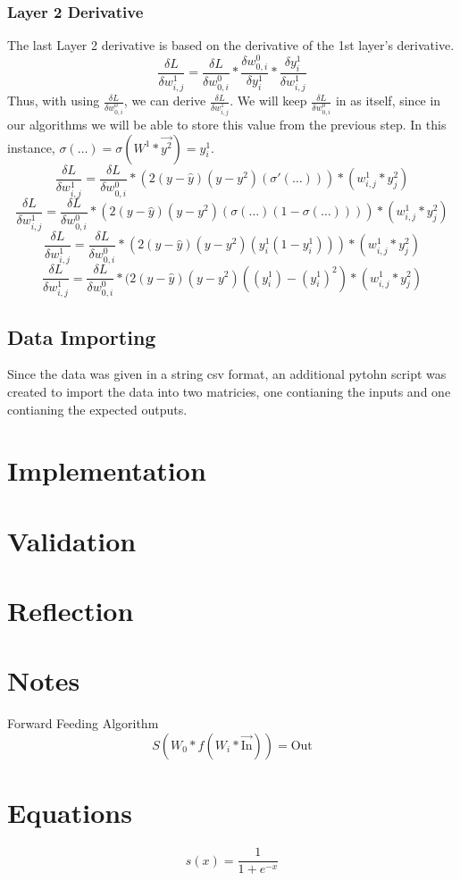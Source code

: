\documentclass[10pt]{article}
\begin{document}
\subsubsection{Layer 2 Derivative}
The last Layer 2 derivative is based on the derivative of the 1st layer's derivative.
$$\frac{\delta L}{\delta w^1_{i,j}} = \frac{\delta L}{\delta w^0_{0,i}} * \frac{\delta w^0_{0,i}}{\delta y^1_i} * \frac{\delta y^1_i}{\delta w^1_{i,j}}$$
Thus, with using $\frac{\delta L}{\delta w^0_{0,i}}$, we can derive $\frac{\delta L}{\delta w^1_{i,j}}$. We will keep $\frac{\delta L}{\delta w^0_{0,i}}$ in as itself, since in our algorithms we will be able to store this value from the previous step. In this instance, $\sigma(\ldots) = \sigma(W^1 * \vec{y^2}) = y^1_i$.
$$\frac{\delta L}{\delta w^1_{i,j}} = \frac{\delta L}{\delta w^0_{0,i}} * (2(y-\hat{y})(y - y^2)(\sigma'(\ldots))) * (w^1_{i,j} * y^2_{j})$$
$$\frac{\delta L}{\delta w^1_{i,j}} = \frac{\delta L}{\delta w^0_{0,i} }* (2(y - \hat{y})(y - y^2)(\sigma(\ldots)(1 - \sigma(\ldots)))) * (w^1_{i,j} * y^2_{j})$$
$$\frac{\delta L}{\delta w^1_{i,j}} = \frac{\delta L}{\delta w^0_{0,i}} * (2(y - \hat{y})(y - y^2)(y^1_i (1 - y^1_i))) * (w^1_{i,j} * y^2_{j})$$
$$\frac{\delta L}{\delta w^1_{i,j}} = \frac{\delta L}{\delta w^0_{0,i}} * (2(y - \hat{y})(y - y^2)((y^1_i) - (y^1_i)^2) * (w^1_{i,j} * y^2_{j})$$


\subsection{Data Importing}
Since the data was given in a string csv format, an additional pytohn script was created to import the data into two matricies, one contianing the inputs and one contianing the expected outputs.


\section{Implementation}
\section{Validation}
\section{Reflection}

\section{Notes}
Forward Feeding Algorithm
$$S(W_0 * f(W_i * \vec{\text{In}})) = \text{Out}$$

\section{Equations}
$$s(x) = \frac{1}{1 + e^{-x}}$$


\end{document}
